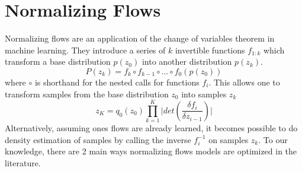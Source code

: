 


\section{Normalizing Flows}

Normalizing flows are an application of the change of variables theorem in machine learning. They introduce a series of  $k$ invertible functions $f_{1:k}$ which transform a base distribution $p(z_{0})$ into another distribution $p(z_{k})$. 
\begin{equation}
P(z_{k}) = f_{k} \circ f_{k-1} \circ ... \circ f_{0}(p(z_{0}))
\end{equation} 
where $\circ$ is shorthand for the nested calls for functions $f_{i}$. This allows one to transform samples from the base distribution $z_{0}$ into samples $z_{k}$
\begin{equation}
	z_{K} = q_{0}(z_{0}) \prod_{k=1}^{K} \bigg|det (\frac{\delta f_{i}}{\delta z_{i-1}}) \bigg|
\end{equation}
Alternatively, assuming ones flows are already learned, it becomes possible to do density estimation of samples by calling the inverse $f_{i}^{-1}$ on samples $z_{k}$. To our knowledge, there are 2 main ways normalizing flows models are optimized in the literature. 

